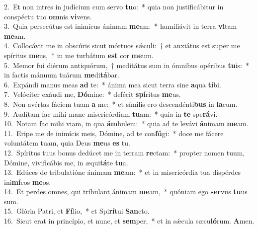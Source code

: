 {2.~}Et non intres in judícium cum servo \textbf{tu}o:~* quia non justificábitur in conspéctu tuo \textbf{om}nis \textbf{vi}vens.\\
{3.~}Quia persecútus est inimícus ánimam \textbf{me}am:~* humiliávit in terra \textbf{vi}tam \textbf{me}am.\\
{4.~}Collocávit me in obscúris sicut mórtuos sǽculi:~† et anxiátus est super me spíritus \textbf{me}us,~* in me turbátum \textbf{est} cor \textbf{me}um.\\
{5.~}Memor fui diérum antiquórum,~† meditátus sum in ómnibus opéribus \textbf{tu}is:~* in factis mánuum tuárum \textbf{me}di\textbf{tá}bar.\\
{6.~}Expándi manus meas \textbf{ad} te:~* ánima mea sicut terra sine \textbf{a}qua \textbf{ti}bi.\\
{7.~}Velóciter exáudi me, \textbf{Dó}mine:~* defécit \textbf{spí}ritus \textbf{me}us.\\
{8.~}Non avértas fáciem tuam \textbf{a} me:~* et símilis ero descendénti\textbf{bus} in \textbf{la}cum.\\
{9.~}Audítam fac mihi mane misericórdiam \textbf{tu}am:~* quia in \textbf{te} spe\textbf{rá}vi.\\
{10.~}Notam fac mihi viam, in qua \textbf{ám}bulem:~* quia ad te levávi \textbf{á}nimam \textbf{me}am.\\
{11.~}Eripe me de inimícis meis, Dómine, ad te con\textbf{fú}gi:~* doce me fácere voluntátem tuam, quia Deus \textbf{me}us \textbf{es} tu.\\
{12.~}Spíritus tuus bonus dedúcet me in terram \textbf{re}ctam:~* propter nomen tuum, Dómine, vivificábis me, in æqui\textbf{tá}te \textbf{tu}a.\\
{13.~}Edúces de tribulatióne ánimam \textbf{me}am:~* et in misericórdia tua dispérdes ini\textbf{mí}cos \textbf{me}os.\\
{14.~}Et perdes omnes, qui tríbulant ánimam \textbf{me}am,~* quóniam ego \textbf{ser}vus \textbf{tu}us sum.\\
{15.~}Glória Patri, et \textbf{Fí}lio,~* et Spi\textbf{rí}tui \textbf{San}cto.\\
{16.~}Sicut erat in princípio, et nunc, et \textbf{sem}per,~* et in sǽcula sæcu\textbf{ló}rum. \textbf{A}men.\\
